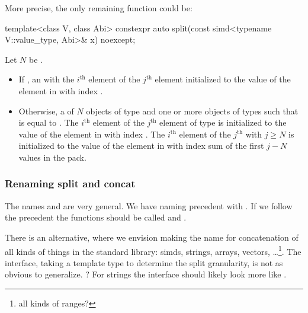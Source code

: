 More precise, the only remaining  function could be:
\begin{wgText}
\begin{itemdecl}
template<class V, class Abi>
  constexpr auto split(const simd<typename V::value_type, Abi>& x) noexcept;
\end{itemdecl}

\begin{itemdescr}

  \pnum Let $N$ be .

  \pnum\returns
  \begin{itemize}
    \item If , an  with
      the $i^\text{th}$ \simd element of the $j^\text{th}$ 
      element initialized to the value of the element in  with index
      .

    \item Otherwise, a  of $N$ objects of type  and one
      or more objects of types  such that
       is equal to .
      The $i^\text{th}$  element of the $j^\text{th}$ 
      element of type  is initialized to the value of the element in
       with index .
      The $i^\text{th}$  element of the $j^\text{th}$ 
      with $j \ge N$ is initialized to the value of the element in 
      with index  sum of the first $j - N$
      values in the  pack.
  \end{itemize}
\end{itemdescr}
\end{wgText}

\subsubsection{Renaming split and concat}

The names  and  are very general.
We have naming precedent with .
If we follow the  precedent the functions should be called
 and .

There is an alternative, where we envision making \std{} the name
for concatenation of all kinds of things in the standard library: simds,
strings, arrays, vectors, \ldots\footnote{all kinds of ranges?}.
The  interface, taking a template type to determine the split
granularity, is not as obvious to generalize.
?
For strings the interface should likely look more like
.

